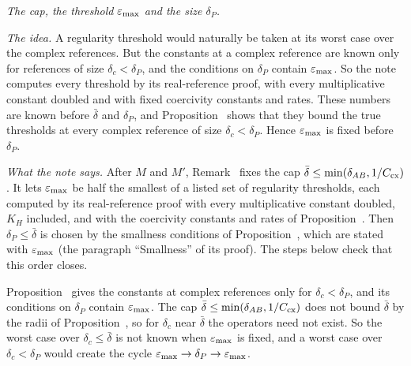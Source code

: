 \begin{detail}\label{det:ledger-emax}
\emph{The cap, the threshold $\varepsilon_{\max}$ and the size $\delta_P$.}

\emph{The idea.} A regularity threshold would naturally be taken at its worst case over the complex references. But the constants at a complex reference are known only for references of size $\delta_c<\delta_P$, and the conditions on $\delta_P$ contain $\varepsilon_{\max}$. So the note computes every threshold by its real-reference proof, with every multiplicative constant doubled and with fixed coercivity constants and rates. These numbers are known before $\bar\delta$ and $\delta_P$, and Proposition~ shows that they bound the true thresholds at every complex reference of size $\delta_c<\delta_P$. Hence $\varepsilon_{\max}$ is fixed before $\delta_P$.

\emph{What the note says.} After $M$ and $M'$, Remark~ fixes the cap $\bar\delta\le\min(\delta_{AB},1/C_{\rm cx})$. It lets $\varepsilon_{\max}$ be half the smallest of a listed set of regularity thresholds, each computed by its real-reference proof with every multiplicative constant doubled, $K_H$ included, and with the coercivity constants and rates of Proposition~. Then $\delta_P\le\bar\delta$ is chosen by the smallness conditions of Proposition~, which are stated with $\varepsilon_{\max}$ (the paragraph ``Smallness'' of its proof). The steps below check that this order closes.

\begin{step}
Proposition~ gives the constants at complex references only for $\delta_c<\delta_P$, and its conditions on $\delta_P$ contain $\varepsilon_{\max}$. The cap $\bar\delta\le\min(\delta_{AB},1/C_{\rm cx})$ does not bound $\bar\delta$ by the radii of Proposition~, so for $\delta_c$ near $\bar\delta$ the operators need not exist. So the worst case over $\delta_c\le\bar\delta$ is not known when $\varepsilon_{\max}$ is fixed, and a worst case over $\delta_c<\delta_P$ would create the cycle $\varepsilon_{\max}\to\delta_P\to\varepsilon_{\max}$.
\end{step}


\end{detail}
